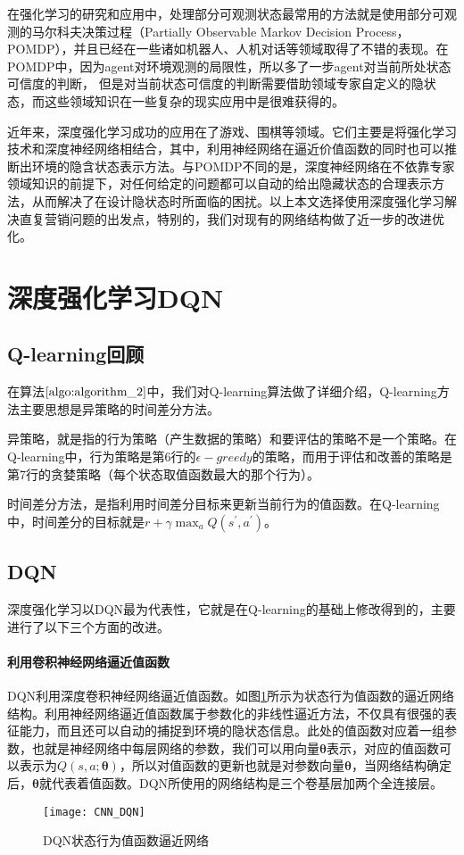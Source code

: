 在强化学习的研究和应用中，处理部分可观测状态最常用的方法就是使用部分可观测的马尔科夫决策过程（Partially Observable Markov  Decision Process，POMDP）\citep{kaelbling1998planning}，并且已经在一些诸如机器人、人机对话等领域取得了不错的表现\citep{pineau2003point,williams2007partially}。在POMDP中，因为agent对环境观测的局限性，所以多了一步agent对当前所处状态可信度的判断，
但是对当前状态可信度的判断需要借助领域专家自定义的隐状态，而这些领域知识在一些复杂的现实应用中是很难获得的。

近年来，深度强化学习成功的应用在了游戏、围棋等领域。它们主要是将强化学习技术和深度神经网络相结合，其中，利用神经网络在逼近价值函数的同时也可以推断出环境的隐含状态表示方法。与POMDP不同的是，深度神经网络在不依靠专家领域知识的前提下，对任何给定的问题都可以自动的给出隐藏状态的合理表示方法\citep{deng2014deep}，从而解决了在设计隐状态时所面临的困扰。以上本文选择使用深度强化学习解决直复营销问题的出发点，特别的，我们对现有的网络结构做了近一步的改进优化。

\section{深度强化学习DQN}
\subsection{Q-learning回顾}
在算法$\ref{algo:algorithm_2}$中，我们对Q-learning算法做了详细介绍，Q-learning方法主要思想是异策略的时间差分方法。

异策略，就是指的行为策略（产生数据的策略）和要评估的策略不是一个策略。在Q-learning中，行为策略是第6行的$\epsilon-greedy$的策略，而用于评估和改善的策略是第7行的贪婪策略（每个状态取值函数最大的那个行为）。

时间差分方法，是指利用时间差分目标来更新当前行为的值函数。在Q-learning中，时间差分的目标就是$r+\gamma \max_{a} Q(s^{'},a^{'})$。
\subsection{DQN}
 深度强化学习以DQN最为代表性，它就是在Q-learning的基础上修改得到的，主要进行了以下三个方面的改进。

 \paragraph{利用卷积神经网络逼近值函数}
 DQN利用深度卷积神经网络逼近值函数。如图\ref{fig:CNN_DQN}所示为状态行为值函数的逼近网络结构。利用神经网络逼近值函数属于参数化的非线性逼近方法，不仅具有很强的表征能力，而且还可以自动的捕捉到环境的隐状态信息。此处的值函数对应着一组参数，也就是神经网络中每层网络的参数，我们可以用向量$\mathbf{\theta}$表示，对应的值函数可以表示为$Q(s,a;\mathbf{\theta})$，所以对值函数的更新也就是对参数向量$\mathbf{\theta}$，当网络结构确定后，$\mathbf{\theta}$就代表着值函数。DQN所使用的网络结构是三个卷基层加两个全连接层。
\begin{figure}[htbp]
\centering
\texttt{[image: CNN\_DQN]}
\caption{DQN状态行为值函数逼近网络}
\label{fig:CNN_DQN}
\end{figure}

